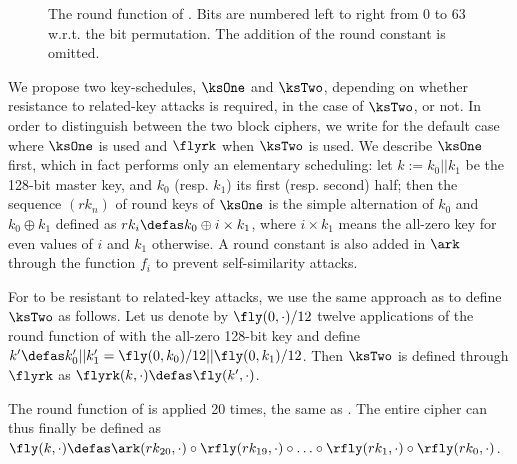 \begin{figure}[ht]
\centering

\caption[The round function of \fly.]{The round function of \fly.\label{fig:fly_spn} Bits are numbered left to right from 0 to 63 w.r.t. the bit permutation. The addition of the round constant is
omitted.}
\end{figure}

\medskip


We propose two key-schedules, $\ksOne$ and $\ksTwo$, depending on whether resistance to related-key attacks is required, in the case of $\ksTwo$, or not.
In order to distinguish between the two block ciphers, we write \fly for the default case where $\ksOne$ is used and $\flyrk$ when $\ksTwo$ is used.
We describe $\ksOne$ first, which in fact performs only an elementary scheduling:
let $k := k_0||k_1$ be the 128-bit master key, and $k_0$ (resp. $k_1$) its first (resp. second) half; then
the sequence $(rk_n)$ of round keys of $\ksOne$ is the simple alternation of $k_0$ and $k_0 \oplus k_1$ defined as $rk_i \defas k_0 \oplus i\times k_1$, where
$i\times k_1$
means the all-zero key for even values of $i$ and $k_1$ otherwise.
A round constant is also added in $\ark$ through the function $f_i$ to prevent self-similarity attacks.

\medskip

For \fly to be resistant to related-key attacks, we use the same approach as \noekeon \cite{noekeon} to define $\ksTwo$ as follows. Let us denote by $\fly(0, \cdot)/12$ twelve applications of the round function of \fly
with the all-zero 128-bit key and define $k' \defas k_0'||k_1' = \fly(0, k_0)/12||\fly(0, k_1)/12$. Then $\ksTwo$ is defined through $\flyrk$ as $\flyrk(k, \cdot) \defas \fly(k', \cdot)$.

\medskip

The round function of \fly is applied 20 times, the same as \pride. The entire cipher can thus finally be defined
as $\fly(k,\cdot) \defas \ark(rk_{20},\cdot) \circ \rfly(rk_{19}, \cdot) \circ \ldots \circ \rfly(rk_1, \cdot) \circ \rfly(rk_0,\cdot)$.


